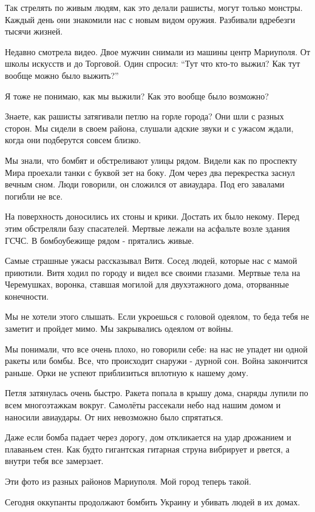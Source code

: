 Так стрелять по живым людям, как это делали рашисты, могут только монстры.
Каждый день они знакомили нас с  новым видом  оружия. Разбивали вдребезги
тысячи жизней. 

Недавно смотрела видео. Двое мужчин снимали из машины центр Мариуполя.  От
школы искусств и до Торговой. Один спросил: \enquote{Тут что кто-то выжил? Как
тут вообще можно было выжить?} 

Я тоже не понимаю, как мы  выжили? Как это вообще было возможно?

Знаете, как рашисты затягивали петлю  на горле города? Они шли с разных сторон.
Мы сидели в своем района, слушали адские  звуки  и с ужасом  ждали, когда   они
подберутся совсем близко. 

Мы знали, что  бомбят и обстреливают улицы рядом. Видели как по проспекту Мира
проехали танки с буквой зет на боку.  Дом через два перекрестка    заснул
вечным сном. Люди говорили, он сложился от авиаудара.   Под его  завалами
погибли не все. 

На поверхность доносились их стоны и крики. Достать их было некому. Перед этим
обстреляли базу спасателей.  Мертвые  лежали на асфальте возле здания ГСЧС. В
бомбоубежище рядом -  прятались  живые. 

Самые страшные ужасы рассказывал Витя. Сосед людей,  которые нас с мамой
приютили. Витя ходил  по городу и видел все своими глазами. Мертвые тела на
Черемушках, воронка, ставшая могилой для двухэтажного дома, оторванные
конечности.

Мы не хотели этого слышать. Если  укроешься с головой одеялом, то беда тебя не
заметит и пройдет мимо. Мы закрывались одеялом от войны. 

Мы понимали, что все очень плохо, но говорили себе: на нас не упадет ни одной
ракеты или бомбы. Все, что происходит снаружи - дурной сон. Война закончится
раньше. Орки не успеют приблизиться вплотную к нашему дому. 

Петля затянулась очень быстро.  Ракета попала в крышу дома, снаряды лупили по
всем   многоэтажкам  вокруг. Самолёты рассекали небо над нашим домом  и
наносили авиаудары. От них невозможно было спрятаться. 

Даже если бомба падает через дорогу, дом  откликается на удар  дрожанием и
плаваньем стен. Как будто гигантская  гитарная струна вибрирует и рвется, а
внутри тебя все замерзает. 

Эти фото из разных районов Мариуполя. Мой город теперь такой.

Сегодня оккупанты  продолжают бомбить Украину и убивать людей в их домах.

